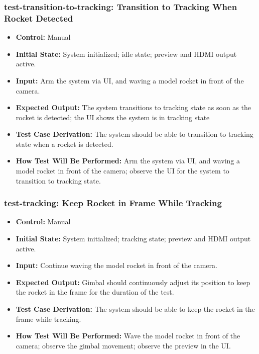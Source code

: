 \documentclass[12pt, titlepage]{article}
\begin{document}
\subsubsection*{test-transition-to-tracking: Transition to Tracking When Rocket Detected}
\begin{itemize}
  \item \textbf{Control:} Manual
  \item \textbf{Initial State:} System initialized; idle state; preview and HDMI output active.
  \item \textbf{Input:} Arm the system via UI, and waving a model rocket in front of the camera.
  \item \textbf{Expected Output:} The system transitions to tracking state as soon as the rocket is detected; the UI shows the system is in tracking state
  \item \textbf{Test Case Derivation:} The system should be able to transition to tracking state when a rocket is detected.
  \item \textbf{How Test Will Be Performed:} Arm the system via UI, and waving a model rocket in front of the camera; observe the UI for the system to transition to tracking state.
\end{itemize}

\subsubsection*{test-tracking: Keep Rocket in Frame While Tracking}
\begin{itemize}
  \item \textbf{Control:} Manual
  \item \textbf{Initial State:} System initialized; tracking state; preview and HDMI output active.
  \item \textbf{Input:} Continue waving the model rocket in front of the camera.
  \item \textbf{Expected Output:} Gimbal should continuously adjust its position to keep the rocket in the frame for the duration of the test.
  \item \textbf{Test Case Derivation:} The system should be able to keep the rocket in the frame while tracking.
  \item \textbf{How Test Will Be Performed:} Wave the model rocket in front of the camera; observe the gimbal movement; observe the preview in the UI.
\end{itemize}
\end{document}
